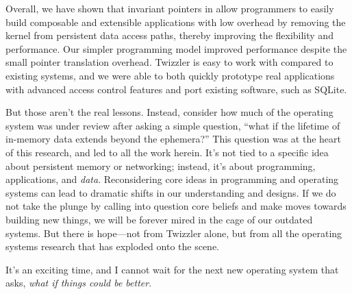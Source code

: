
Overall, we have shown that invariant pointers in \Twizzler allow programmers to easily build
composable and extensible applications with low overhead
by removing the kernel from persistent data access paths,
thereby improving the flexibility and performance.
Our simpler programming model improved performance despite the small
pointer translation overhead.
Twizzler is easy to work with
compared to existing systems, and we were able to both quickly prototype real
applications with advanced access control features and port existing software, such as SQLite.

But those aren't the real lessons. Instead, consider how much of the operating system was under review after asking a
simple question, ``what if the lifetime of in-memory data extends beyond the ephemera?'' This question was at the heart
of this research, and led to all the work herein. It's not tied to a specific idea about persistent
memory or networking; instead, it's about programming, applications, and
\emph{data}. Reconsidering core ideas in programming and operating systems can lead to dramatic shifts in our understanding and
designs. If we do not take the plunge by calling into question core beliefs and make moves towards building new things,
we will be forever mired in the cage of our outdated systems. But there is hope---not from Twizzler alone, but from all
the operating systems research that has exploded onto the scene.

\vspace{5mm}

\noindent It's an exciting time, and I cannot wait for the next
new operating system that asks, \emph{what if things could be better}.

